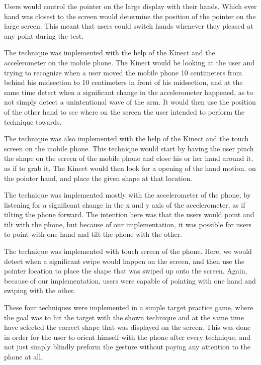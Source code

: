 Users would control the pointer on the large display with their hands. Which ever hand was closest to the screen would determine the position of the pointer on the large screen. This meant that users could switch hands whenever they pleased at any point during the test. 

The \throw technique was implemented with the help of the Kinect and the accelerometer on the mobile phone. The Kinect would be looking at the user and trying to recognize when a user moved the mobile phone 10 centimeters from behind his midsection to 10 centimeters in front of his midsection, and at the same time detect when a significant change in the accelerometer happened, as to not simply detect a unintentional wave of the arm. It would then use the position of the other hand to see where on the screen the user intended to perform the \throw technique towards. 

The \pinch technique was also implemented with the help of the Kinect and the touch screen on the mobile phone. This technique would start by having the user pinch the shape on the screen of the mobile phone and close his or her hand around it, as if to grab it. The Kinect would then look for a opening of the hand motion, on the pointer hand, and place the given shape at that location. 

The \tilt technique was implemented mostly with the accelerometer of the phone, by listening for a significant change in the x and y axis of the accelerometer, as if tilting the phone forward. The intention here was that the users would point and tilt with the phone, but because of our implementation, it was possible for users to point with one hand and tilt the phone with the other. 

The \swipe technique was implemented with touch screen of the phone. Here, we would detect when a significant swipe would happen on the screen, and then use the pointer location to place the shape that was swiped up onto the screen. Again, because of our implementation, users were capable of pointing with one hand and swiping with the other. 

These four techniques were implemented in a simple target practice game, where the goal was to hit the target with the shown technique and at the same time have selected the correct shape that was displayed on the screen. This was done in order for the user to orient himself with the phone after every technique, and not just simply blindly preform the gesture without paying any attention to the phone at all.  

